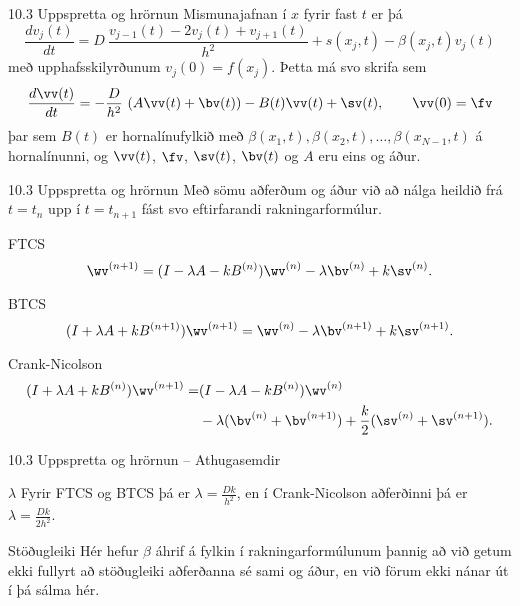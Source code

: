 \begin{frame}{10.3 Uppspretta og hrörnun}
Mismunajafnan í $x$ fyrir fast $t$ er þá 
 $$ 
 \frac{d v_j(t)}{d t} =  D\  \frac{v_{j-1}(t) -2 v_j(t) + v_{j+1}(t)}{h^2} + 
 s(x_j,t) - \beta(x_j,t)v_j(t)
 $$ \pause
 með upphafsskilyrðunum $v_j(0) = f(x_j)$. \pause
 Þetta má svo skrifa sem
 $$ 
 \frac{d \vv(t)}{d t} =  -\frac{D}{h^2}\  (A\vv(t) + \bv(t)) 
 -B(t)\vv(t) + \sv(t), \qquad \vv(0)=\fv
 $$
 þar sem $B(t)$ er hornalínufylkið með 
 $\beta(x_1,t), \beta(x_2,t),\ldots,\beta(x_{N-1},t)$ á hornalínunni, \pause
 og $\vv(t)$,  $\fv$, $\sv(t)$, $\bv(t)$ og $A$ eru eins og áður.
  \end{frame}

  \begin{frame}{10.3 Uppspretta og hrörnun}
Með sömu aðferðum og áður við að nálga heildið frá $t=t_n$ upp í $t=t_{n+1}$
fást svo eftirfarandi rakningarformúlur.\pause

\begin{block}{FTCS}
   $$
     \wv^{(n+1)} = (I-\lambda A - kB^{(n)})\wv^{(n)} 
     - \lambda \bv^{(n)} + k\sv^{(n)}.
    $$\pause
\end{block}

\begin{block}{BTCS}
   $$
     (I+\lambda A + kB^{(n+1)})\wv^{(n+1)} = \wv^{(n)} 
     - \lambda \bv^{(n+1)} + k\sv^{(n+1)}.
    $$\pause
\end{block}

\begin{block}{Crank-Nicolson}
   \begin{align*}
     (I+\lambda A + kB^{(n)})\wv^{(n+1)}  = &
     (I-\lambda A - kB^{(n)})\wv^{(n)}\\ 
     & - \lambda (\bv^{(n)}+\bv^{(n+1)}) + \frac k2(\sv^{(n)}+\sv^{(n+1)}).
    \end{align*}\pause
\end{block}
\end{frame}

  \begin{frame}{10.3 Uppspretta og hrörnun -- Athugasemdir}
  \begin{block}{$\lambda$}
   Fyrir FTCS og BTCS þá er $\lambda = \frac{Dk}{h^2}$, en 
  í Crank-Nicolson aðferðinni þá er $\lambda = \frac{Dk}{2h^2}$.
  \end{block}
  
  \pause
  
  \begin{block}{Stöðugleiki}
   Hér hefur $\beta$ áhrif á fylkin í rakningarformúlunum þannig að 
   við getum ekki fullyrt að stöðugleiki aðferðanna sé sami
   og áður, en við förum ekki nánar út í þá sálma hér.
  \end{block}
  \end{frame}


